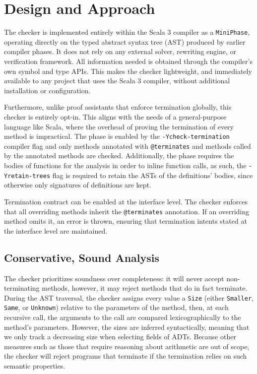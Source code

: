 \chapter{Design and Approach}

The checker is implemented entirely within the Scala 3 compiler as a
\texttt{MiniPhase}, operating directly on the typed abstract syntax tree (AST)
produced by earlier compiler phases. It does not rely on any external solver,
rewriting engine, or verification framework. All information needed is obtained
through the compiler's own symbol and type APIs. This makes the checker
lightweight, and immediately available to any project that uses the Scala 3
compiler, without additional installation or configuration.

Furthermore, unlike proof assistants that enforce termination globally, this
checker is entirely opt-in. This aligns with the needs of a general-purpose
language like Scala, where the overhead of proving the termination of every
method is impractical.
The phase is enabled by the \texttt{-Ycheck-termination} compiler flag and only
methods annotated with \texttt{@terminates} and methods called by the annotated
methods are checked.
Additionally, the phase requires the bodies of functions for the analysis in
order to inline function calls, as such, the \texttt{-Yretain-trees} flag is
required to retain the ASTs of the definitions' bodies, since otherwise only
signatures of definitions are kept.

Termination contract can be enabled at the interface level. The checker enforces
that all overriding methods inherit the \texttt{@terminates} annotation. If an
overriding method omits it, an error is thrown, ensuring that termination
intents stated at the interface level are maintained.

\section{Conservative, Sound Analysis}
The checker prioritizes soundness over completeness: it will never accept
non-terminating methods, however, it may reject methods that do in fact
terminate.
During the AST traversal, the checker assigns every value a \texttt{Size}
(either \texttt{Smaller}, \texttt{Same}, or \texttt{Unknown}) relative to the
parameters of the method, then, at each recursive call, the arguments to the
call are compared lexicographically to the method's parameters. However, the
sizes are inferred syntactically, meaning that we only track a decreasing size
when selecting fields of ADTs. Because other measures such as those that 
require reasoning about arithmetic are out of scope, the checker will reject
programs that terminate if the termination relies on such semantic properties.

